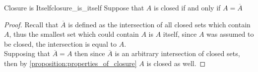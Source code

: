 \begin{proposition}{Closure is Itself}{closure_is_itself}
Suppose that \( A \) is closed if and only if \( A = \overline{A}  \) 
\end{proposition}
\begin{proof}
    Recall that \( \overline{A}  \) is defined as the intersection of all closed
    sets which contain \( A \), thus the smallest set which could contain \( A
    \) is \( A \) itself, since \( A \) was assumed to be closed, the
    intersection is equal to \( A \).\\ 
    Supposing that \( \overline{A} = A \) then since \( \overline{A}  \) is an
    arbitrary intersection of closed sets, then by
    \ref{proposition:properties_of_closure} \( A \) is closed as well.
\end{proof}
